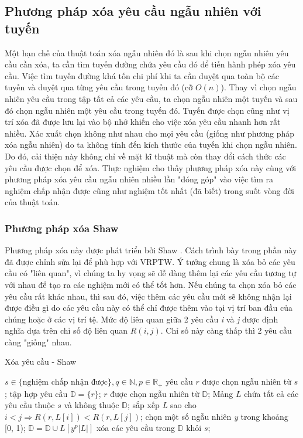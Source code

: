 \subsection*{Phương pháp xóa yêu cầu ngẫu nhiên với tuyến}
Một hạn chế của thuật toán xóa ngẫu nhiên đó là sau khi chọn ngẫu nhiên yêu cầu cần xóa, ta cần tìm tuyến đường chứa yêu cầu đó để tiến hành phép xóa yêu cầu. Việc tìm tuyến đường khá tốn chi phí khi ta cần duyệt qua toàn bộ các tuyến và duyệt qua từng yêu cầu trong tuyến đó (cỡ $O(n)$). Thay vì chọn ngẫu nhiên yêu cầu trong tập tất cả các yêu cầu, ta chọn ngẫu nhiên một tuyến và sau đó chọn ngẫu nhiên một yêu cầu trong tuyến đó. Tuyến được chọn cũng như vị trí xóa đã được lưu lại vào bộ nhớ khiến cho việc xóa yêu cầu nhanh hơn rất nhiều. Xác xuất chọn không như nhau cho mọi yêu cầu (giống như phương pháp xóa ngẫu nhiên) do ta không tính đến kích thước của tuyến khi chọn ngẫu nhiên. Do đó, cải thiện này không chỉ về mặt kĩ thuật mà còn thay đổi cách thức các yêu cầu được chọn để xóa. Thực nghiệm cho thấy phương pháp xóa này cùng với phương pháp xóa yêu cầu ngẫu nhiên nhiều lần "đóng góp" vào việc tìm ra nghiệm chấp nhận được cũng như nghiệm tốt nhất (đã biết) trong suốt vòng đời của thuật toán.

\subsubsection*{Phương pháp xóa Shaw}
Phương pháp xóa này được phát triển bởi Shaw \cite{shaw1998using}. Cách trình bày trong phần này đã được chỉnh sửa lại để phù hợp với VRPTW. Ý tưởng chung là xóa bỏ các yêu cầu có "liên quan", vì chúng ta hy vọng sẽ dễ dàng thêm lại các yêu cầu tương tự với nhau để tạo ra các nghiệm mới có thể tốt hơn. Nếu chúng ta chọn xóa bỏ các yêu cầu rất khác nhau, thì sau đó, việc thêm các yêu cầu mới sẽ không nhận lại được điều gì do các yêu cầu này có thể chỉ được thêm vào tại vị trí ban đầu của chúng hoặc ở các vị trí tệ. Mức độ liên quan giữa 2 yêu cầu \textit{i} và \textit{j} được định nghĩa dựa trên chỉ số độ liên quan $R(i,j)$. Chỉ số này càng thấp thì 2 yêu cầu càng "giống" nhau.

\begin{algorithm}
	\caption{Xóa yêu cầu - Shaw}
	\begin{algorithmic}[1]
		\Require $s \in \text{\{nghiệm chấp nhận được\}}, q \in \mathbb{N}, p \in \mathbb{R}_{+}$
		\State yêu cầu $r$ được chọn ngẫu nhiên từ $s$;
		\State tập hợp yêu cầu $\mathbb{D}=\{r\}$;
		\State $r$ được chọn ngẫu nhiên từ $\mathbb{D}$;
		\State Mảng $L$ chứa tất cả các yêu cầu thuộc $s$ và không thuộc $\mathbb{D}$;
		\State sắp xếp \textit{L} sao cho $i<j \Rightarrow R(r, L\left[ i \right]) < R(r, L\left[ j \right])$;
		\State chọn một số ngẫu nhiên \textit{y} trong khoảng [0, 1);
		\State $\mathbb{D}=\mathbb{D}\cup {L \left[ y^p|L| \right]}$
		\EndWhile
		\State xóa các yêu cầu trong $\mathbb{D}$ khỏi $s$;
	\end{algorithmic}
\end{algorithm}

